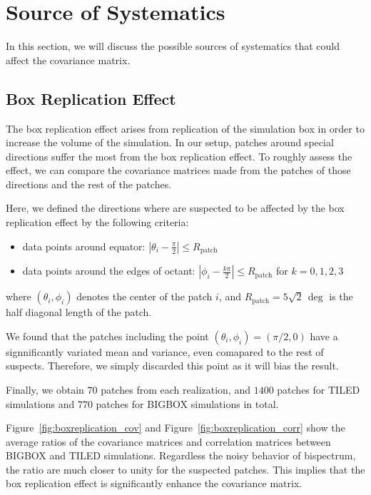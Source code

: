 \section{Source of Systematics}
In this section, we will discuss the possible sources of systematics that could affect the covariance matrix. 

\subsection{Box Replication Effect}\label{sec:boxreplication}
The box replication effect arises from replication of the simulation box in order to increase the volume of the simulation. In our setup, patches around special directions suffer the most from the box replication effect. To roughly assess the effect, we can compare the covariance matrices made from the patches of those directions and the rest of the patches.

Here, we defined the directions where are suspected to be affected by the box replication effect by the following criteria:
\begin{itemize}
    \item data points around equator: $ \left| \theta_i - \frac{\pi}{2} \right| \leq R_{\text{patch}} $
    \item data points around the edges of octant: $ \left| \phi_i - \frac{k\pi}{2} \right| \leq R_{\text{patch}} $ for $k=0,1,2,3$
\end{itemize}
where $(\theta_i, \phi_i)$ denotes the center of the patch $i$, and $R_{\text{patch}} = 5\sqrt{2}\, \mathrm{\deg}$ is the half diagonal length of the patch. 

We found that the patches including the point $(\theta_i, \phi_i) = (\pi/2, 0)$ have a signnificantly variated mean and variance, even comapared to the rest of suspects. Therefore, we simply discarded this point as it will bias the result. 

Finally, we obtain $70$ patches from each realization, and $1400$ patches for TILED simulations and $770$ patches for BIGBOX simulations in total.

Figure~\ref{fig:boxreplication_cov} and Figure~\ref{fig:boxreplication_corr} show the average ratios of the covariance matrices and correlation matrices between BIGBOX and TILED simulations. Regardless the noisy behavior of bispectrum, the ratio are much closer to unity for the suspected patches. This implies that the box replication effect is significantly enhance the covariance matrix.

